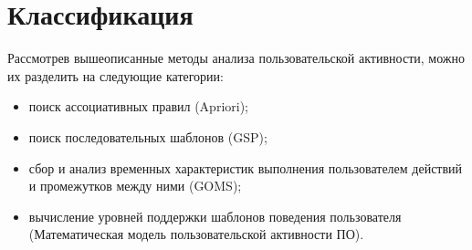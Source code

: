 \section{Классификация}
Рассмотрев вышеописанные методы анализа пользовательской активности, можно их разделить на следующие категории:
\begin{itemize}
	\item поиск ассоциативных правил (Apriori);
	\item поиск последовательных шаблонов (GSP);
	\item сбор и анализ временных характеристик выполнения пользователем действий и промежутков между ними (GOMS);
	\item вычисление уровней поддержки шаблонов поведения пользователя (Математическая модель пользовательской активности ПО).
\end{itemize}

